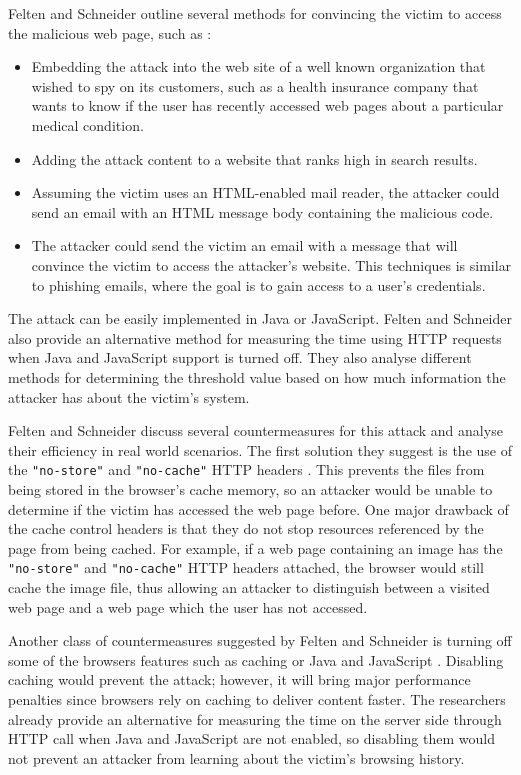 \documentclass[10pt,a4paper,twoside]{book}
\begin{document}
Felten and Schneider outline several methods for convincing the victim to access the malicious web page, such as \cite{felten2000timing}:
\begin{itemize}
\item Embedding the attack into the web site of a well known organization that wished to spy on its customers, such as a health insurance company that wants to know if the user has recently accessed web pages about a particular medical condition.
\item Adding the attack content to a website that ranks high in search results. 
\item Assuming the victim uses an HTML-enabled mail reader, the attacker could send an email with an HTML message body containing the malicious code.
\item The attacker could send the victim an email with a message that will convince the victim to access the attacker's website. This techniques is similar to phishing emails, where the goal is to gain access to a user's credentials.
\end{itemize}

The attack can be easily implemented in Java or JavaScript. Felten and Schneider also provide an alternative method for measuring the time using HTTP requests when Java and JavaScript support is turned off. They also analyse different methods for determining the threshold value based on how much information the attacker has about the victim's system.

Felten and Schneider discuss several countermeasures for this attack and analyse their efficiency in real world scenarios. The first solution they suggest is the use of the \texttt{"no-store"} and \texttt{"no-cache"} HTTP headers \cite{felten2000timing}. This prevents the files from being stored in the browser's cache memory, so an attacker would be unable to determine if the victim has accessed the web page before. One major drawback of the cache control headers is that they do not stop resources referenced by the page from being cached. For example, if a web page containing an image has the \texttt{"no-store"} and \texttt{"no-cache"} HTTP headers attached, the browser would still cache the image file, thus allowing an attacker to distinguish between a visited web page and a web page which the user has not accessed.

Another class of countermeasures suggested by Felten and Schneider is turning off some of the browsers features such as caching or Java and JavaScript \cite{felten2000timing}. Disabling caching would prevent the attack; however, it will bring major performance penalties since browsers rely on caching to deliver content faster. The researchers already provide an alternative for measuring the time on the server side through HTTP call when Java and JavaScript are not enabled, so disabling them would not prevent an attacker from learning about the victim's browsing history.
\end{document}
